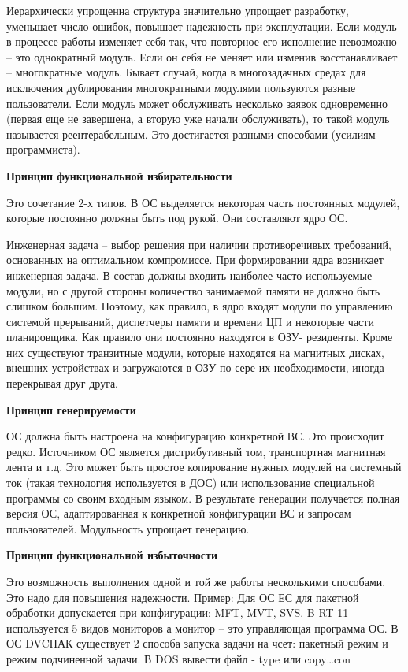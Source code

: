 Иерархически упрощенна структура значительно упрощает разработку, уменьшает число ошибок, повышает надежность при эксплуатации.
Если модуль в процессе работы изменяет себя так, что повторное его исполнение невозможно – это однократный модуль. Если он себя не меняет или изменив восстанавливает – многократные модуль. Бывает случай, когда в многозадачных средах для исключения дублирования многократными модулями пользуются разные пользователи. Если модуль может обслуживать несколько заявок одновременно (первая еще не завершена, а вторую уже начали обслуживать), то такой модуль называется реентерабельным. Это достигается разными способами (усилиям программиста).
\newline

\textbf{Принцип функциональной избирательности}

Это сочетание 2-х типов. В ОС выделяется некоторая часть постоянных модулей, которые постоянно должны быть под рукой. Они составляют ядро ОС.

Инженерная задача – выбор решения при наличии противоречивых требований, основанных на оптимальном компромиссе. При формировании ядра возникает инженерная задача. В состав должны входить наиболее часто используемые модули, но с другой стороны количество занимаемой памяти не должно быть слишком большим. Поэтому, как правило, в ядро входят модули по управлению системой прерываний, диспетчеры памяти и времени ЦП и некоторые части планировщика. Как правило они постоянно находятся в ОЗУ- резиденты. Кроме них существуют транзитные модули, которые находятся на магнитных дисках, внешних устройствах и загружаются в ОЗУ по сере их необходимости, иногда перекрывая друг друга.
\newline

\textbf{Принцип генерируемости}

ОС должна быть настроена на конфигурацию конкретной ВС. Это происходит редко. Источником ОС является дистрибутивный том, транспортная магнитная лента и т.д. Это может быть простое копирование нужных модулей на системный ток (такая технология используется в ДОС) или использование специальной программы со своим входным языком. В результате генерации получается полная версия ОС, адаптированная к конкретной конфигурации ВС и запросам пользователей. Модульность упрощает генерацию.
\newline

\textbf{Принцип функциональной избыточности}

Это возможность выполнения одной и той же работы несколькими способами. Это надо для повышения надежности. Пример: Для ОС ЕС для пакетной обработки допускается при конфигурации: MFT, MVT, SVS. B RT-11 используется 5 видов мониторов а монитор – это управляющая программа ОС. В ОС DVCПАК существует 2 способа запуска задачи на чсет: пакетный режим и режим подчиненной задачи. В DOS вывести файл - type или copy…con
\newline

